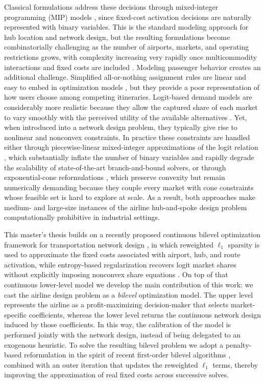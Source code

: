Classical formulations address these decisions through mixed-integer programming (MIP) models \cite{OKelly1987,Campbell1994Integer,AlumurKara2008,CampbellOKelly2012,FarahaniHekmatfarBolooriNikbakhsh2013}, since fixed-cost activation decisions are naturally represented with binary variables. This is the standard modeling approach for hub location and network design, but the resulting formulations become combinatorially challenging as the number of airports, markets, and operating restrictions grows, with complexity increasing very rapidly once multicommodity interactions and fixed costs are included \cite{AlumurKara2008,CampbellOKelly2012}. Modeling passenger behavior creates an additional challenge. Simplified all-or-nothing assignment rules are linear and easy to embed in optimization models \cite{Sheffi1985,MagnantiWong1984}, but they provide a poor representation of how users choose among competing itineraries. Logit-based demand models are considerably more realistic because they allow the captured share of each market to vary smoothly with the perceived utility of the available alternatives \cite{BenAkivaLerman1985,Train2009}. Yet, when introduced into a network design problem, they typically give rise to nonlinear and nonconvex constraints. In practice these constraints are handled either through piecewise-linear mixed-integer approximations of the logit relation \cite{Vielma2015}, which substantially inflate the number of binary variables and rapidly degrade the scalability of state-of-the-art branch-and-bound solvers, or through exponential-cone reformulations \cite{LubinYamangilBentVielma2018}, which preserve convexity but remain numerically demanding because they couple every market with cone constraints whose feasible set is hard to explore at scale. As a result, both approaches make medium- and large-size instances of the airline hub-and-spoke design problem computationally prohibitive in industrial settings.

This master's thesis builds on a recently proposed continuous bilevel optimization framework for transportation network design \cite{RealRojas2026TRB,CandesWakinBoyd2008}, in which reweighted $\ell_1$ sparsity is used to approximate the fixed costs associated with airport, hub, and route activation, while entropy-based regularization recovers logit market shares without explicitly imposing nonconvex share equations \cite{RealRojas2026TRB,Oppenheim1993}. On top of that continuous lower-level model we develop the main contribution of this work: we cast the airline design problem as a \emph{bilevel} optimization model. The upper level represents the airline as a profit-maximizing decision-maker that selects market-specific coefficients, whereas the lower level returns the continuous network design induced by those coefficients. In this way, the calibration of the model is performed jointly with the network design, instead of being delegated to an exogenous heuristic. To solve the resulting bilevel problem we adopt a penalty-based reformulation in the spirit of recent first-order bilevel algorithms \cite{AiyoshiShimizu1984,LuMei2024,Jiang2024Primal}, combined with an outer iteration that updates the reweighted $\ell_1$ terms, thereby improving the approximation of real fixed costs across successive solves.

